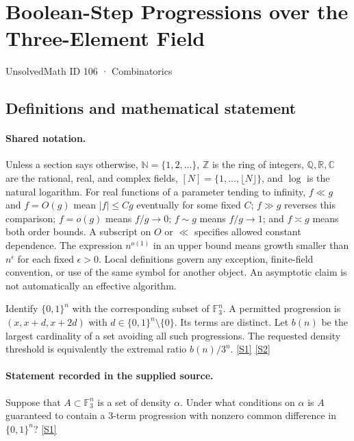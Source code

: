 \documentclass[11pt,a4paper]{article}
\newcommand{\N}{\mathbb{N}}
\newcommand{\Z}{\mathbb{Z}}
\newcommand{\Q}{\mathbb{Q}}
\newcommand{\R}{\mathbb{R}}
\newcommand{\C}{\mathbb{C}}
\newcommand{\F}{\mathbb{F}}
\newcommand{\sref}[2]{\hyperlink{source:#1:#2}{[S#2]}}
\begin{document}

\setcounter{section}{105}

\section{Boolean-Step Progressions over the Three-Element Field}\label{106}

{\small\sffamily UnsolvedMath ID 106 · Combinatorics}

\subsection{Definitions and mathematical statement}

\paragraph{Shared notation.}Unless a section says otherwise, $\N=\{1,2,\ldots\}$,
$\Z$ is the ring of integers, $\Q,\R,\C$ are the rational, real, and complex
fields, $[N]=\{1,\ldots,\lfloor N\rfloor\}$, and $\log$ is the natural
logarithm. For real functions of a parameter tending to infinity,
$f\ll g$ and $f=O(g)$ mean $|f|\leq Cg$ eventually for some fixed $C$;
$f\gg g$ reverses this comparison; $f=o(g)$ means $f/g\to0$;
$f\sim g$ means $f/g\to1$; and $f\asymp g$ means both order bounds.
A subscript on $O$ or $\ll$ specifies allowed constant dependence.
The expression $n^{o(1)}$ in an upper bound means growth smaller than
$n^\epsilon$ for each fixed $\epsilon>0$. Local definitions govern any
exception, finite-field convention, or use of the same symbol for another
object. An asymptotic claim is not automatically an effective algorithm.



Identify $\{0,1\}^n$ with the corresponding subset of $\F_3^n$. A permitted progression is $(x,x+d,x+2d)$ with $d\in\{0,1\}^n\setminus\{0\}$. Its terms are distinct. Let $b(n)$ be the largest cardinality of a set avoiding all such progressions. The requested density threshold is equivalently the extremal ratio $b(n)/3^n$. \sref{106}{1} \sref{106}{2}

\paragraph{Statement recorded in the supplied source.}
Suppose that $A \subset \mathbb{F}_3^n$ is a set of density $\alpha$. Under what conditions on $\alpha$ is $A$ guaranteed to contain a 3-term progression with nonzero common difference in $\{0, 1\}^n$? \sref{106}{1}
\end{document}
